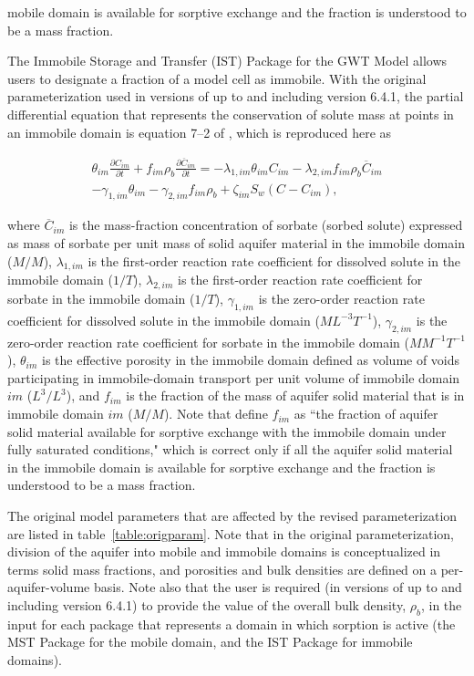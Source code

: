 mobile domain is available for sorptive exchange and the fraction is understood to be a mass fraction.

The Immobile Storage and Transfer (IST) Package for the GWT Model allows users to designate a fraction of a model cell as immobile. With the original parameterization used in versions of \mf up to and including version 6.4.1, the partial differential equation that represents the conservation of solute mass at points in an immobile domain is equation 7--2 of \cite{modflow6gwt}, which is reproduced here as 

\begin{equation}
\label{eqn:gwtistpdeorig}
\begin{split}
\theta_{im} \frac{\partial C_{im} }{\partial t} + f_{im} \rho_b \frac{\partial \overline{C}_{im}}{\partial t} = 
- \lambda_{1,im} \theta_{im} C_{im} - \lambda_{2,im}  f_{im} \rho_b \overline{C}_{im} \\
- \gamma_{1,im} \theta_{im} - \gamma_{2,im} f_{im}  \rho_b 
+ \zeta_{im} S_w \left ( C - C_{im} \right ),
\end{split}
\end{equation}

\noindent where $\overline{C}_{im}$ is the mass-fraction concentration of sorbate (sorbed solute) expressed as mass of sorbate per unit mass of solid aquifer material in the immobile domain ($M/M$), $\lambda_{1,im}$ is the first-order reaction rate coefficient for dissolved solute in the immobile domain ($1/T$), $\lambda_{2,im}$ is the first-order reaction rate coefficient for sorbate in the immobile domain ($1/T$), $\gamma_{1,im}$ is the zero-order reaction rate coefficient for dissolved solute in the immobile domain ($ML^{-3}T^{-1}$), $\gamma_{2,im}$ is the zero-order reaction rate coefficient for sorbate in the immobile domain ($M M^{-1}T^{-1}$), $\theta_{im}$ is the effective porosity in the immobile domain defined as volume of voids participating in immobile-domain transport per unit volume of immobile domain $im$ ($L^3/L^3$), and $f_{im}$ is the fraction of the mass of aquifer solid material that is in immobile domain $im$ ($M/M$). Note that \cite{modflow6gwt} define $f_{im}$ as ``the fraction of aquifer solid material available for sorptive exchange with the immobile domain under fully saturated conditions," which is correct only if all the aquifer solid material in the immobile domain is available for sorptive exchange and the fraction is understood to be a mass fraction.

The original model parameters that are affected by the revised parameterization are listed in table~\ref{table:origparam}. Note that in the original parameterization, division of the aquifer into mobile and immobile domains is conceptualized in terms solid mass fractions, and porosities and bulk densities are defined on a per-aquifer-volume basis. Note also that the user is required (in versions of \mf up to and including version 6.4.1) to provide the value of the overall bulk density, $\rho_b$, in the input for each package that represents a domain in which sorption is active (the MST Package for the mobile domain, and the IST Package for immobile domains).

